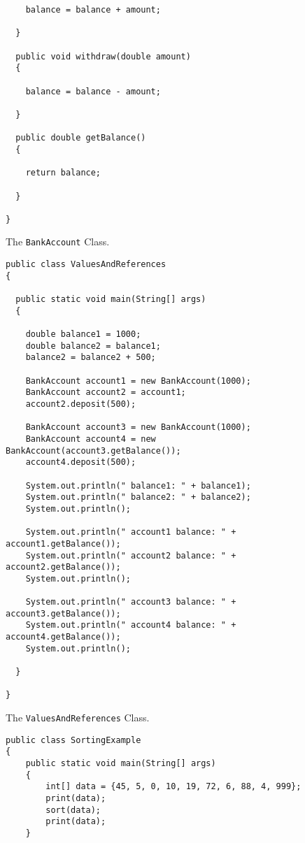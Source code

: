 \documentclass[12pt]{article}
\begin{document}
\begin{enumerate}
\begin{figure}[t]
{\begin{verbatim}
    balance = balance + amount;

  }

  public void withdraw(double amount)
  {

    balance = balance - amount;

  }

  public double getBalance()
  {

    return balance;

  }

}
\end{verbatim}
}
\caption{The {\tt BankAccount} Class.}
\label{BankAccount}
\end{figure}

\begin{figure}[t]

\footnotesize{
\begin{verbatim}
public class ValuesAndReferences
{

  public static void main(String[] args)
  {

    double balance1 = 1000;
    double balance2 = balance1;
    balance2 = balance2 + 500;

    BankAccount account1 = new BankAccount(1000);
    BankAccount account2 = account1;
    account2.deposit(500);

    BankAccount account3 = new BankAccount(1000);
    BankAccount account4 = new BankAccount(account3.getBalance());
    account4.deposit(500);

    System.out.println(" balance1: " + balance1);
    System.out.println(" balance2: " + balance2);
    System.out.println();

    System.out.println(" account1 balance: " + account1.getBalance());
    System.out.println(" account2 balance: " + account2.getBalance());
    System.out.println();

    System.out.println(" account3 balance: " + account3.getBalance());
    System.out.println(" account4 balance: " + account4.getBalance());
    System.out.println();

  }

}
\end{verbatim}
}

\caption{The {\tt ValuesAndReferences} Class.}
\label{ValuesAndReferences}
\end{figure}

\begin{figure}[t]

\footnotesize{
\begin{verbatim}
public class SortingExample
{
    public static void main(String[] args)
    {
        int[] data = {45, 5, 0, 10, 19, 72, 6, 88, 4, 999};
        print(data);
        sort(data);
        print(data);
    }


\end{verbatim}}
\end{figure}
\end{enumerate}
\end{document}
